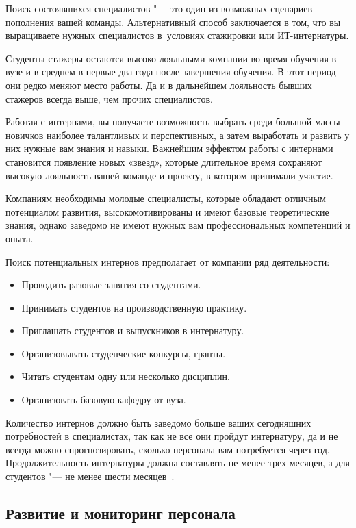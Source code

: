 \documentclass{../industrial-development}
\begin{document}
\lecturenotes

Поиск состоявшихся специалистов "--- это один из возможных сценариев пополнения вашей команды. Альтернативный способ заключается в том, что вы выращиваете нужных специалистов в~условиях стажировки или ИТ-интернатуры.

Студенты-стажеры остаются высоко-лояльными компании во время обучения в вузе и в среднем в первые два года после завершения обучения. В этот период они редко меняют место работы. Да и в дальнейшем лояльность бывших стажеров всегда выше, чем прочих специалистов.

Работая с интернами, вы получаете возможность выбрать среди большой массы новичков наиболее талантливых и перспективных, а затем выработать и развить у них нужные вам знания и навыки. Важнейшим эффектом работы с интернами становится появление новых «звезд», которые длительное время сохраняют высокую лояльность вашей команде и проекту, в котором принимали участие.

Компаниям необходимы молодые специалисты, которые обладают отличным потенциалом развития, высокомотивированы и имеют базовые теоретические знания, однако заведомо не имеют нужных вам профессиональных компетенций и опыта.

Поиск потенциальных интернов предполагает от компании ряд деятельности:
  \begin{itemize}
\item	Проводить разовые занятия со студентами.
\item	Принимать студентов на производственную практику.
\item	Приглашать студентов и выпускников в интернатуру.
\item	Организовывать студенческие конкурсы, гранты.
\item	Читать студентам одну или несколько дисциплин.
\item Организовать базовую кафедру от вуза.
  \end{itemize}
Количество интернов должно быть заведомо больше ваших сегодняшних потребностей в специалистах, так как не все они пройдут интернатуру, да и не всегда можно спрогнозировать, сколько персонала вам потребуется через год. Продолжительность интернатуры должна составлять не менее трех месяцев, а для студентов "--- не менее шести месяцев~\cite[с.~277--279]{Pererva}.

\subsection{Развитие и мониторинг персонала}
\end{document}
